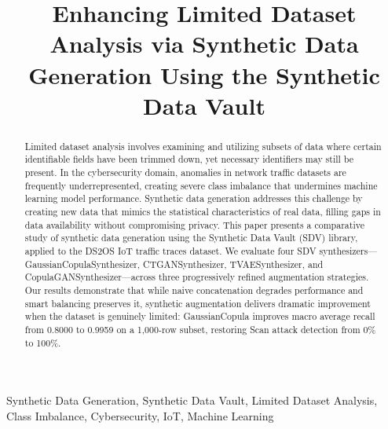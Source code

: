 \documentclass[conference]{IEEEtran}
\begin{document}
\title{Enhancing Limited Dataset Analysis via Synthetic Data Generation Using the Synthetic Data Vault}

\author{
\and
{}
}

\maketitle

\begin{abstract}
Limited dataset analysis involves examining and utilizing subsets of data where certain identifiable fields have been trimmed down, yet necessary identifiers may still be present. In the cybersecurity domain, anomalies in network traffic datasets are frequently underrepresented, creating severe class imbalance that undermines machine learning model performance. Synthetic data generation addresses this challenge by creating new data that mimics the statistical characteristics of real data, filling gaps in data availability without compromising privacy. This paper presents a comparative study of synthetic data generation using the Synthetic Data Vault (SDV) library, applied to the DS2OS IoT traffic traces dataset. We evaluate four SDV synthesizers---GaussianCopulaSynthesizer, CTGANSynthesizer, TVAESynthesizer, and CopulaGANSynthesizer---across three progressively refined augmentation strategies. Our results demonstrate that while naive concatenation degrades performance and smart balancing preserves it, synthetic augmentation delivers dramatic improvement when the dataset is genuinely limited: GaussianCopula improves macro average recall from 0.8000 to 0.9959 on a 1,000-row subset, restoring Scan attack detection from 0\% to 100\%.
\end{abstract}

\begin{IEEEkeywords}
Synthetic Data Generation, Synthetic Data Vault, Limited Dataset Analysis, Class Imbalance, Cybersecurity, IoT, Machine Learning
\end{IEEEkeywords}
\end{document}
